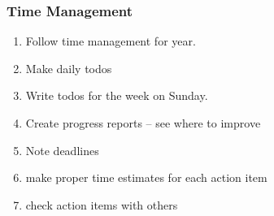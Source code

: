 \begin{frame}
\frametitle{Time Management}
\begin{enumerate}
\item Follow time management for year.
\item Make daily todos
\item Write todos for the week on Sunday. 
\item Create progress reports -- see where to improve 
\item Note deadlines
\item make proper time estimates for each action item
\item check action items with others 
\end{enumerate} 
\end{frame} 
